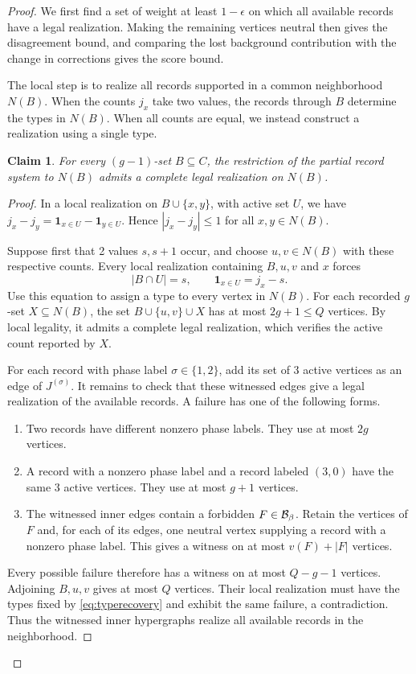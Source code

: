 \documentclass[10pt]{article}
\numberwithin{equation}{section}
\newtheorem{claim}[claim]{Claim}\aliascntresetthe{claim}
\theoremstyle{definition}
\begin{document}
\begin{proof}
We first find a set of weight at least $1-\epsilon$ on which all available records have a legal realization. Making the remaining vertices neutral then gives the disagreement bound, and comparing the lost background contribution with the change in corrections gives the score bound.

The local step is to realize all records supported in a common neighborhood $N(B)$. When the counts $j_x$ take two values, the records through $B$ determine the types in $N(B)$. When all counts are equal, we instead construct a realization using a single type.

\begin{claim}\label{lem:commonlink}
For every $(g-1)$-set $B\subseteq C$, the restriction of the partial record system to $N(B)$ admits a complete legal realization on $N(B)$.
\end{claim}
\begin{proof}
In a local realization on $B\cup\{x,y\}$, with active set $U$, we have $j_x-j_y=\mathbf1_{x\in U}-\mathbf1_{y\in U}$. Hence $|j_x-j_y|\le1$ for all $x,y\in N(B)$.

Suppose first that 2 values $s,s+1$ occur, and choose $u,v\in N(B)$ with these respective counts. Every local realization containing $B,u,v$ and $x$ forces
\begin{equation}\label{eq:typerecovery}
 |B\cap U|=s,\qquad \mathbf1_{x\in U}=j_x-s.
\end{equation}
Use this equation to assign a type to every vertex in $N(B)$. For each recorded $g$-set $X\subseteq N(B)$, the set $B\cup\{u,v\}\cup X$ has at most $2g+1\le Q$ vertices. By local legality, it admits a complete legal realization, which verifies the active count reported by $X$.

For each record with phase label $\sigma\in\{1,2\}$, add its set of $3$ active vertices as an edge of $J^{(\sigma)}$. It remains to check that these witnessed edges give a legal realization of the available records. A failure has one of the following forms.
\begin{enumerate}[beginpenalty=10000]
\item Two records have different nonzero phase labels. They use at most $2g$ vertices.
\item A record with a nonzero phase label and a record labeled $(3,0)$ have the same $3$ active vertices. They use at most $g+1$ vertices.
\item The witnessed inner edges contain a forbidden $F\in\mathcal B_\beta$. Retain the vertices of $F$ and, for each of its edges, one neutral vertex supplying a record with a nonzero phase label. This gives a witness on at most $v(F)+|F|$ vertices.
\end{enumerate}
Every possible failure therefore has a witness on at most $Q-g-1$ vertices. Adjoining $B,u,v$ gives at most $Q$ vertices. Their local realization must have the types fixed by \eqref{eq:typerecovery} and exhibit the same failure, a contradiction. Thus the witnessed inner hypergraphs realize all available records in the neighborhood.


\end{proof}
\end{proof}
\end{document}
